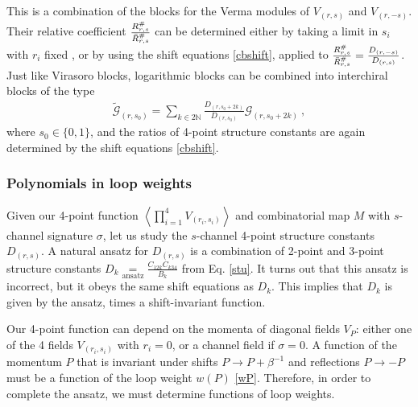 \documentclass[12pt, a4paper]{article}
\begin{document}
This is a combination of the blocks for the Verma modules of $V_{(r,s)}$ and $V_{(r,-s)}$. Their relative coefficient $\frac{R^{\#}_{r,s}}{\vphantom{\tilde{|}}\bar{R}^{\#}_{r,s}}$ can be determined either by taking a limit in $s_i$ with $r_i$ fixed \cite{gnjrs21}, or by using the shift equations \eqref{cbshift}, applied to $\frac{R^{\#}_{r,s}}{\vphantom{\tilde{|}}\bar{R}^{\#}_{r,s}} = \frac{D_{(r,-s)}}{D_{(r,s)}}$. 
Just like Virasoro blocks, logarithmic blocks can be combined into interchiral blocks of the type 
\begin{align}
 \widetilde{\mathcal{G}}_{(r,s_0)} = \sum_{k\in 2\mathbb{N}} \frac{D_{(r,s_0+2k)}}{D_{(r,s_0)}} \mathcal{G}_{(r,s_0+2k)}\ , 
\end{align}
where $s_0\in \{0,1\}$, and the ratios of 4-point structure constants are again determined by the shift equations \eqref{cbshift}. 

\subsubsection{Polynomials in loop weights}\label{sec:plw}

Given our 4-point function $\left<\prod_{i=1}^4 V_{(r_i,s_i)}\right>$ and combinatorial map $M$ with $s$-channel signature $\sigma$, let us study the $s$-channel 4-point structure constants $D_{(r,s)}$. A natural ansatz for $D_{(r,s)}$ is a combination of 2-point and 3-point structure constants $D_k \underset{\text{ansatz}}{=} \frac{C_{12k}C_{k34}}{B_k}$ from Eq. \eqref{stu}. It turns out that this ansatz is incorrect, but it obeys the same shift equations as $D_k$. This implies that $D_k$ is given by the ansatz, times a shift-invariant function.

Our 4-point function can depend on the momenta of diagonal fields $V_P$: either one of the 4 fields $V_{(r_i,s_i)}$ with $r_i=0$, or a channel field if $\sigma =0$. A function of the momentum $P$ that is invariant under shifts $P\to P+\beta^{-1}$ and reflections $P\to -P$ must be a function of the loop weight $w(P)$ \eqref{wP}. Therefore, in order to complete the ansatz, we must determine functions of loop weights.
\end{document}

